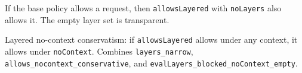 \begin{theorem}\label{thm:layer_add_monotone}
\leanok
If the base policy allows a request, then \texttt{allowsLayered}
with \texttt{noLayers} also allows it.  The empty layer set is
transparent.
\end{theorem}

\begin{theorem}\label{thm:layered_nocontext_conservative}
\leanok
Layered no-context conservatism: if \texttt{allowsLayered} allows
under any context, it allows under \texttt{noContext}.  Combines
\texttt{layers\_narrow}, \texttt{allows\_nocontext\_conservative},
and \texttt{evalLayers\_blocked\_noContext\_empty}.
\end{theorem}
